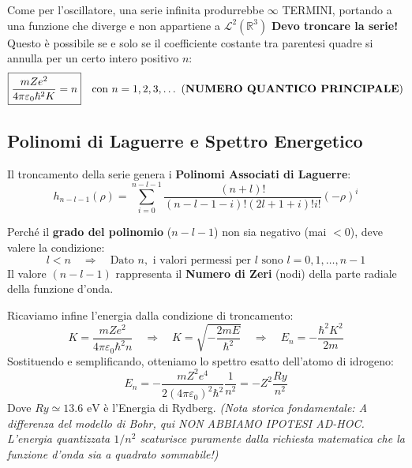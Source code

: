 \documentclass[11pt, a4paper]{article}
\begin{document}
\noindent
Come per l'oscillatore, una serie infinita produrrebbe $\infty$ TERMINI, portando a una funzione che diverge e non appartiene a $\mathcal{L}^2(\mathbb{R}^3)$ %
\textbf{Devo troncare la serie!} Questo è possibile se e solo se il coefficiente costante tra parentesi quadre si annulla per un certo intero positivo $n$: %
\begin{equation}
    \boxed{ \frac{m Z e^2}{4\pi\varepsilon_0 \hbar^2 K} = n } \quad \text{con } n = 1, 2, 3, \dots \text{ (\textbf{NUMERO QUANTICO PRINCIPALE})} %
\end{equation}

\subsection{Polinomi di Laguerre e Spettro Energetico} %

Il troncamento della serie genera i \textbf{Polinomi Associati di Laguerre}: %
\begin{equation*}
    h_{n-l-1}(\rho) = \sum_{i=0}^{n-l-1} \frac{(n+l)!}{(n-l-1-i)!(2l+1+i)! i!} (-\rho)^i %
\end{equation*}

\noindent
Perché il \textbf{grado del polinomio} ($n-l-1$) non sia negativo (mai $<0$), deve valere la condizione: %
\begin{equation}
    \boxed{ l < n } \quad \Rightarrow \quad \text{Dato } n, \text{ i valori permessi per } l \text{ sono } l = 0, 1, \dots, n-1 %
\end{equation}
Il valore $(n-l-1)$ rappresenta il \textbf{Numero di Zeri} (nodi) della parte radiale della funzione d'onda. %

Ricaviamo infine l'energia dalla condizione di troncamento: %
\begin{equation*}
    K = \frac{m Z e^2}{4\pi\varepsilon_0 \hbar^2 n} \quad \Rightarrow \quad K = \sqrt{-\frac{2mE}{\hbar^2}} \quad \Rightarrow \quad E_n = - \frac{\hbar^2 K^2}{2m} %
\end{equation*}
Sostituendo e semplificando, otteniamo lo spettro esatto dell'atomo di idrogeno: %
\begin{equation}
    \boxed{ E_n = - \frac{m Z^2 e^4}{2(4\pi\varepsilon_0)^2 \hbar^2} \frac{1}{n^2} = - Z^2 \frac{Ry}{n^2} } %
\end{equation}
Dove $Ry \simeq 13.6 \text{ eV}$ è l'Energia di Rydberg.
\textit{(Nota storica fondamentale: A differenza del modello di Bohr, qui NON ABBIAMO IPOTESI AD-HOC. L'energia quantizzata $1/n^2$ scaturisce puramente dalla richiesta matematica che la funzione d'onda sia a quadrato sommabile!)} 
\end{document}

